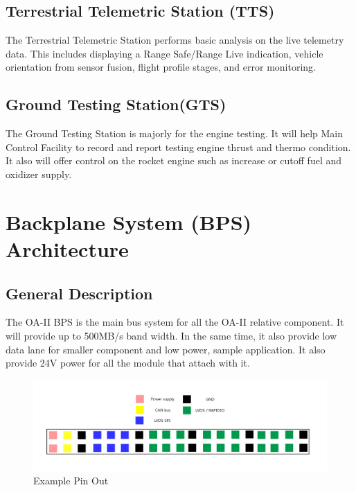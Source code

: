 \documentclass[12pt,article]{memoir}
\begin{document}
\section{Terrestrial Telemetric Station (TTS)}
The Terrestrial Telemetric Station performs basic analysis on the live telemetry data. This includes displaying a Range Safe/Range Live indication, vehicle orientation from sensor fusion, flight profile stages, and error monitoring.
\section{Ground Testing Station(GTS)}
The Ground Testing Station is majorly for the engine testing. It will help Main Control Facility to record and report testing engine thrust and thermo condition. It also will offer control on the rocket engine such as increase or cutoff fuel and oxidizer supply.
\newpage


\chapter{Backplane System (BPS) Architecture}
\section{General Description}
The OA-II BPS is the main bus system for all the OA-II relative component. It will provide up to 500MB/s band width. In the same time, it also provide low data lane for smaller component and low power, sample application. It also provide 24V power for all the module that attach with it.
\begin{figure}[h]
\includegraphics[width=\textwidth]{img/ES00002_BPS_Pin.png}
 \caption{Example Pin Out}	
\end{figure}
\end{document}
